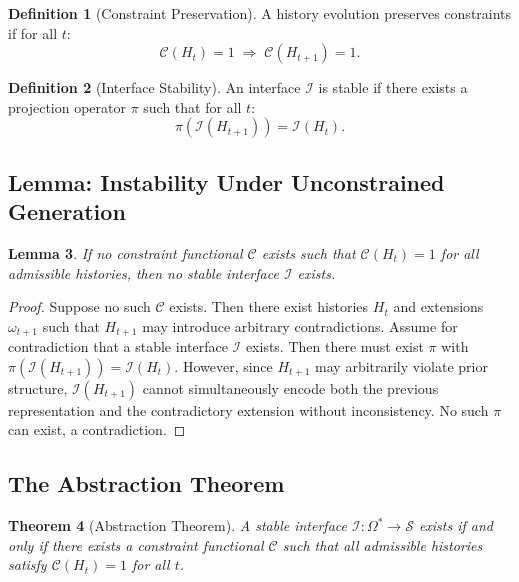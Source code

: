 \documentclass[12pt, a4paper]{article}
\theoremstyle{plain}
\newtheorem{theorem}{Theorem}[section]
\newtheorem{lemma}[theorem]{Lemma}
\theoremstyle{definition}
\newtheorem{definition}[theorem]{Definition}
\theoremstyle{remark}
\begin{document}
\begin{definition}[Constraint Preservation]
A history evolution preserves constraints if for all $t$:
\[
\mathcal{C}(H_t) = 1 \;\Rightarrow\; \mathcal{C}(H_{t+1}) = 1.
\]
\end{definition}

\begin{definition}[Interface Stability]
An interface $\mathcal{I}$ is stable if there exists a projection operator $\pi$ such that for all $t$:
\[
\pi(\mathcal{I}(H_{t+1})) = \mathcal{I}(H_t).
\]
\end{definition}

\subsection{Lemma: Instability Under Unconstrained Generation}

\begin{lemma}
If no constraint functional $\mathcal{C}$ exists such that $\mathcal{C}(H_t) = 1$ for all admissible histories, then no stable interface $\mathcal{I}$ exists.
\end{lemma}

\begin{proof}
Suppose no such $\mathcal{C}$ exists. Then there exist histories $H_t$ and extensions $\omega_{t+1}$ such that $H_{t+1}$ may introduce arbitrary contradictions. Assume for contradiction that a stable interface $\mathcal{I}$ exists. Then there must exist $\pi$ with $\pi(\mathcal{I}(H_{t+1})) = \mathcal{I}(H_t)$. However, since $H_{t+1}$ may arbitrarily violate prior structure, $\mathcal{I}(H_{t+1})$ cannot simultaneously encode both the previous representation and the contradictory extension without inconsistency. No such $\pi$ can exist, a contradiction.
\end{proof}

\subsection{The Abstraction Theorem}

\begin{theorem}[Abstraction Theorem]
\label{thm:abstraction}
A stable interface $\mathcal{I} : \Omega^* \to \mathcal{S}$ exists if and only if there exists a constraint functional $\mathcal{C}$ such that all admissible histories satisfy $\mathcal{C}(H_t) = 1$ for all $t$.
\end{theorem}
\end{document}

